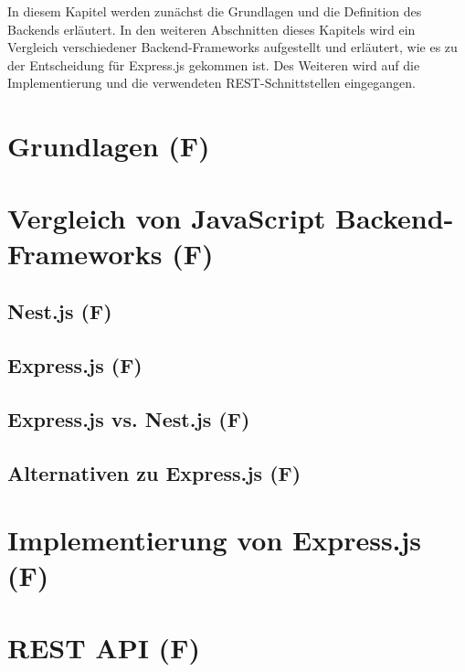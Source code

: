 In diesem Kapitel werden zunächst die Grundlagen und die Definition des Backends erläutert. In den weiteren Abschnitten dieses Kapitels wird ein Vergleich verschiedener Backend-Frameworks aufgestellt und erläutert, wie es zu der Entscheidung für Express.js gekommen ist. Des Weiteren wird auf die Implementierung und die verwendeten REST-Schnittstellen eingegangen.

\section{Grundlagen (F)}


\section{Vergleich von JavaScript Backend-Frameworks (F)}


\subsection{Nest.js (F)}


\subsection{Express.js (F)}


\subsection{Express.js vs. Nest.js (F)}


\subsection{Alternativen zu Express.js (F)}


\section{Implementierung von Express.js (F)}


\section{REST API (F)}


